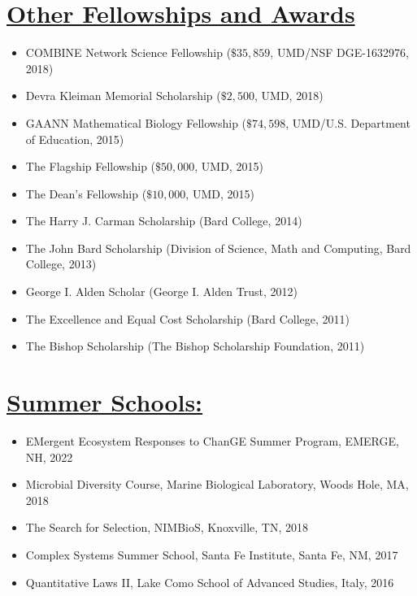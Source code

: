 \documentclass[]{res}
\begin{document}
\begin{resume}
  
   \section{\underline{Other Fellowships and Awards}} %
\begin{itemize}[leftmargin=*]
\item[] COMBINE Network Science Fellowship ($\$35,859$, UMD/NSF DGE-1632976, 2018)
\item[] Devra Kleiman Memorial Scholarship ($\$2,500$, UMD, 2018)
\item[] GAANN Mathematical Biology Fellowship ($\$74,598$, UMD/U.S. Department of Education, 2015)
\item[] The Flagship Fellowship ($\$50,000$, UMD, 2015)
\item[] The Dean's Fellowship ($\$10,000$, UMD, 2015)
\item[] The Harry J. Carman Scholarship (Bard College, 2014)
\item[] The John Bard Scholarship (Division of Science, Math and Computing, Bard College, 2013)
\item[] George I. Alden Scholar (George I. Alden Trust, 2012)%
\item[] The Excellence and Equal Cost Scholarship (Bard College, 2011) 
\item[] The Bishop Scholarship (The Bishop Scholarship Foundation, 2011)
\end{itemize}
  
\section{\underline{Summer Schools:}}%
\begin{itemize}[leftmargin=*]
\item[] {EMergent Ecosystem Responses to ChanGE Summer Program}, EMERGE, NH, 2022
\item[] {Microbial Diversity Course}, Marine Biological Laboratory, Woods Hole, MA, 2018
\item[] {The Search for Selection}, NIMBioS, Knoxville, TN, 2018
\item[] {Complex Systems Summer School}, Santa Fe Institute, Santa Fe, NM, 2017
\item[] {Quantitative Laws II}, Lake Como School of Advanced Studies, Italy, 2016  
 \end{itemize}  
 

\end{resume}
\end{document}
